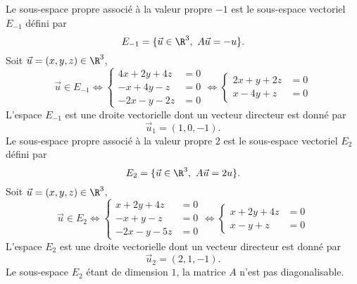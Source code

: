 {\begin{enumerate}
{Le sous-espace propre associ\'e \`a la valeur propre $-1$ est le sous-espace vectoriel $E_{-1}$ d\'efini par
$$E_{-1}=\{\vec u\in\R^3,\ A\vec u=-u\}.$$
Soit $\vec u=(x,y,z)\in\R^3$, 
$$\vec u\in E_{-1}\iff \left\{\begin{align*}4x+2y+4z&=0 \\  -x+4y-z&=0 \\  -2x-y-2z&=0\end{align*}\right.
\iff\left\{ \begin{align*}2x+y+2z&=0 \\  x-4y+z&=0 \end{align*}\right.$$
L'espace $E_{-1}$ est une droite vectorielle dont un vecteur directeur est donn\'e par 
$$\vec u_1=(1,0,-1).$$
Le sous-espace propre associ\'e \`a la valeur propre $2$ est le sous-espace vectoriel $E_{2}$ d\'efini par
$$E_{2}=\{\vec u\in\R^3,\ A\vec u=2u\}.$$
Soit $\vec u=(x,y,z)\in\R^3$, 
$$\vec u\in E_{2}\iff \left\{\begin{align*}x+2y+4z&=0 \\  -x+y-z&=0 \\  -2x-y-5z&=0\end{align*}\right.
\iff \left\{\begin{align*}x+2y+4z&=0 \\  x-y+z&=0 \end{align*}\right.$$
L'espace $E_{2}$ est une droite vectorielle dont un vecteur directeur est donn\'e par 
$$\vec u_2=(2,1,-1).$$
Le sous-espace $E_2$ \'etant de dimension $1$, la matrice $A$ n'est pas diagonalisable.

}
\end{enumerate}}
